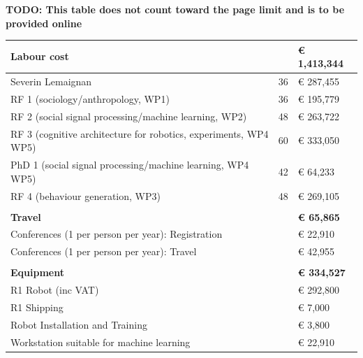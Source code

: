 \documentclass[11pt,a4paper]{report}
\newcommand{\TODO}[1]{{\color{red}\textbf{TODO: #1}}}
\begin{document}
\TODO{This table does not count toward the page limit and is to be provided online}
\begin{table}[]
\begin{tabular}{@{}lll@{}}
\toprule
\textbf{Labour cost}                                             & \textbf{} & \textbf{€ 1,413,344} \\ \midrule
Severin Lemaignan                                                & 36        & € 287,455            \\
RF 1 (sociology/anthropology, WP1)                               & 36        & € 195,779            \\
RF 2 (social signal processing/machine learning, WP2)            & 48        & € 263,722            \\
RF 3 (cognitive architecture for robotics, experiments, WP4 WP5) & 60        & € 333,050            \\
PhD 1 (social signal processing/machine learning, WP4 WP5)       & 42        & € 64,233             \\
RF 4 (behaviour generation, WP3)                                 & 48        & € 269,105            \\
                                                                 &           &                      \\
\textbf{Travel}                                                  & \textbf{} & \textbf{€ 65,865}    \\ \midrule
Conferences (1 per person per year): Registration                &           & € 22,910             \\
Conferences (1 per person per year): Travel                      &           & € 42,955             \\
                                                                 &           &                      \\
\textbf{Equipment}                                               & \textbf{} & \textbf{€ 334,527}   \\ \midrule
R1 Robot (inc VAT)                                               &           & € 292,800            \\
R1 Shipping                                                      &           & € 7,000              \\
Robot Installation and Training                                  &           & € 3,800              \\
Workstation suitable for machine learning                        &           & € 22,910             \\

\end{tabular}
\end{table}
\end{document}
